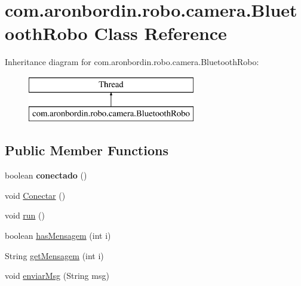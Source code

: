 \hypertarget{classcom_1_1aronbordin_1_1robo_1_1camera_1_1BluetoothRobo}{\section{com.\+aronbordin.\+robo.\+camera.\+Bluetooth\+Robo Class Reference}
\label{classcom_1_1aronbordin_1_1robo_1_1camera_1_1BluetoothRobo}
}
Inheritance diagram for com.\+aronbordin.\+robo.\+camera.\+Bluetooth\+Robo\+:\begin{figure}[H]
\begin{center}
\leavevmode
\includegraphics[height=2.000000cm]{da/df5/classcom_1_1aronbordin_1_1robo_1_1camera_1_1BluetoothRobo}
\end{center}
\end{figure}
\subsection*{Public Member Functions}
\begin{DoxyCompactItemize}
\item 
\hypertarget{classcom_1_1aronbordin_1_1robo_1_1camera_1_1BluetoothRobo_a27e09a097a737dfe4fefea2299410ece}{boolean {\bfseries conectado} ()}\label{classcom_1_1aronbordin_1_1robo_1_1camera_1_1BluetoothRobo_a27e09a097a737dfe4fefea2299410ece}

\item 
void \hyperlink{classcom_1_1aronbordin_1_1robo_1_1camera_1_1BluetoothRobo_a2df2abd3a673b28ce8c15485bbfa7445}{Conectar} ()
\item 
void \hyperlink{classcom_1_1aronbordin_1_1robo_1_1camera_1_1BluetoothRobo_a91456e33e64f7b6014eec4aab7e2aa41}{run} ()
\item 
boolean \hyperlink{classcom_1_1aronbordin_1_1robo_1_1camera_1_1BluetoothRobo_a6f90297b6ea2088d8386ef9903e8f879}{has\+Mensagem} (int i)
\item 
String \hyperlink{classcom_1_1aronbordin_1_1robo_1_1camera_1_1BluetoothRobo_adec3780ecaa5fdda458c88fb7c0614dd}{get\+Mensagem} (int i)
\item 
void \hyperlink{classcom_1_1aronbordin_1_1robo_1_1camera_1_1BluetoothRobo_acc329c69c4399635133fc72f85f696be}{enviar\+Msg} (String msg)
\end{DoxyCompactItemize}


